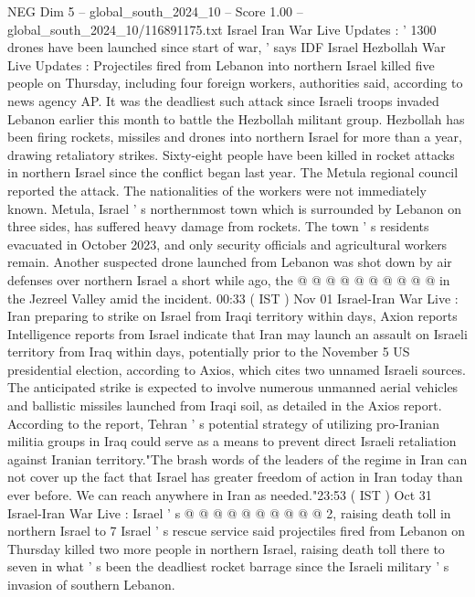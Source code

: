 \begin{textsample}{NEG Dim 5 – global\_south\_2024\_10 – Score 1.00 – global\_south\_2024\_10/116891175.txt}  \label{ex:f5_neg_105}
Israel Iran War Live Updates : ' 1300 drones have been launched since start of war, ' says IDF Israel Hezbollah War Live Updates : Projectiles fired from Lebanon into northern Israel killed five people on Thursday, including four foreign workers, authorities said, according to news agency AP.
It was the deadliest such attack since Israeli troops invaded Lebanon earlier this month to battle the Hezbollah militant group.
Hezbollah has been firing rockets, missiles and drones into northern Israel for more than a year, drawing retaliatory strikes.
Sixty-eight people have been killed in rocket attacks in northern Israel since the conflict began last year.
The Metula regional council reported the attack.
The nationalities of the workers were not immediately known.
Metula, Israel ' s northernmost town which is surrounded by Lebanon on three sides, has suffered heavy damage from rockets.
The town ' s residents evacuated in October 2023, and only security officials and agricultural workers remain.
Another suspected drone launched from Lebanon was shot down by air defenses over northern Israel a short while ago, the @ @ @ @ @ @ @ @ @ @ in the Jezreel Valley amid the incident. 00:33 ( IST ) Nov 01 Israel-Iran War Live : Iran preparing to strike on Israel from Iraqi territory within days, Axion reports Intelligence reports from Israel indicate that Iran may launch an assault on Israeli territory from Iraq within days, potentially prior to the November 5 US presidential election, according to Axios, which cites two unnamed Israeli sources.
The anticipated strike is expected to involve numerous unmanned aerial vehicles and ballistic missiles launched from Iraqi soil, as detailed in the Axios report.
According to the report, Tehran ' s potential strategy of utilizing pro-Iranian militia groups in Iraq could serve as a means to prevent direct Israeli retaliation against Iranian territory."The brash words of the leaders of the regime in Iran can not cover up the fact that Israel has greater freedom of action in Iran today than ever before.
We can reach anywhere in Iran as needed."23:53 ( IST ) Oct 31 Israel-Iran War Live : Israel ' s @ @ @ @ @ @ @ @ @ @ 2, raising death toll in northern Israel to 7 Israel ' s rescue service said projectiles fired from Lebanon on Thursday killed two more people in northern Israel, raising death toll there to seven in what ' s been the deadliest rocket barrage since the Israeli military ' s invasion of southern Lebanon.

\end{textsample}

